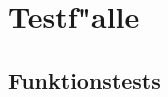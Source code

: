 %
%


\vspace{1em}


\section{Testf{"a}lle}
\label{QS:TF}



%
%
\subsection{Funktionstests}

\vspace{1em}

